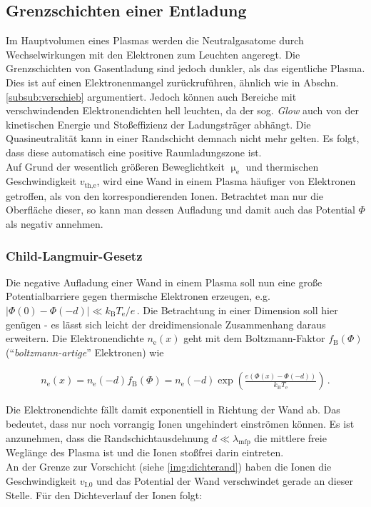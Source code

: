 \documentclass[numbers=noenddot,a4paper]{scrartcl}
\newcommand{\ix}[1]{_\text{#1}}
\newcommand{\tilt}[1]{\textit{#1}}
\begin{document}
		\subsection{Grenzschichten einer Entladung}\label{sub:rand}

			Im Hauptvolumen eines Plasmas werden die Neutralgasatome durch Wechselwirkungen mit den Elektronen zum Leuchten angeregt. Die Grenzschichten von Gasentladung sind jedoch dunkler, als das eigentliche Plasma. Dies ist auf einen Elektronenmangel zur\"uckruf\"uhren, ähnlich wie in Abschn. \ref{subsub:verschieb} argumentiert. Jedoch können auch Bereiche mit verschwindenden Elektronendichten hell leuchten, da der sog. \tilt{Glow} auch von der kinetischen Energie und Stoßeffizienz der Ladungsträger abhängt. Die Quasineutralit\"at kann in einer Randschicht demnach nicht mehr gelten. Es folgt, dass diese automatisch eine positive Raumladungszone ist. \\
			Auf Grund der wesentlich gr\"o{\ss}eren Beweglichtkeit $\upmu\ix{e}$ und thermischen Geschwindigkeit $v\ix{th,e}$, wird eine Wand in einem Plasma h\"aufiger von Elektronen getroffen, als von den korrespondierenden Ionen. Betrachtet man nur die Oberfl\"ache dieser, so kann man dessen Aufladung und damit auch das Potential $\Phi$ als negativ annehmen.

		\subsubsection{Child-Langmuir-Gesetz} \label{subsub:childlang}

		Die negative Aufladung einer Wand in einem Plasma soll nun eine große Potentialbarriere gegen thermische Elektronen erzeugen, e.g. $|\Phi\left(0\right)-\Phi\left(-d\right)|\ll k\ix{B}T\ix{e}/e\,$. Die Betrachtung in einer Dimension soll hier genügen - es lässt sich leicht der dreidimensionale Zusammenhang daraus erweitern. Die Elektronendichte $n\ix{e}\left(x\right)$ geht mit dem Boltzmann-Faktor $f\ix{B}\left(\Phi\right)$ ("`\tilt{boltzmann-artige}"' Elektronen) wie

			\begin{align}
				n\ix{e}\left(x\right)=n\ix{e}\left(-d\right)f\ix{B}\left(\Phi\right)=n\ix{e}\left(-d\right)\exp\left(\frac{e\left(\Phi\left(x\right)-\Phi\left(-d\right)\right)}{k\ix{B}T\ix{e}}\right) \, .
			\end{align}

		Die Elektronendichte fällt damit exponentiell in Richtung der Wand ab. Das bedeutet, dass nur noch vorrangig Ionen ungehindert einströmen können. Es ist anzunehmen, dass die Randschichtausdehnung $d\ll\lambda\ix{mfp}$ die mittlere freie Weglänge des Plasma ist und die Ionen stoßfrei darin eintreten.\\
		An der Grenze zur Vorschicht (siehe \ref{img:dichterand}) haben die Ionen die Geschwindigkeit $v\ix{I,0}$ und das Potential der Wand verschwindet gerade an dieser Stelle. Für den Dichteverlauf der Ionen folgt:
\end{document}
